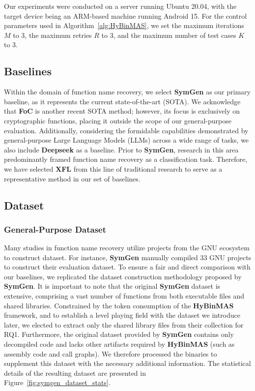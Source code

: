 \documentclass[acmsmall,screen,review,anonymous]{acmart} %
\begin{document}
Our experiments were conducted on a server running Ubuntu 20.04, with the target device being an ARM-based machine running Android 15. For the control parameters used in Algorithm~\ref{alg:HyBinMAS}, we set the maximum iterations $M$ to 3, the maximum retries $R$ to 3, and the maximum number of test cases $K$ to 3.

\subsection{Baselines}

Within the domain of function name recovery, we select \textbf{SymGen} as our primary baseline, as it represents the current state-of-the-art (SOTA). We acknowledge that \textbf{FoC} is another recent SOTA method; however, its focus is exclusively on cryptographic functions, placing it outside the scope of our general-purpose evaluation. Additionally, considering the formidable capabilities demonstrated by general-purpose Large Language Models (LLMs) across a wide range of tasks, we also include \textbf{Deepseek} as a baseline. Prior to \textbf{SymGen}, research in this area predominantly framed function name recovery as a classification task. Therefore, we have selected \textbf{XFL} from this line of traditional research to serve as a representative method in our set of baselines.

\subsection{Dataset}

\subsubsection{General-Purpose Dataset}

Many studies in function name recovery utilize projects from the GNU ecosystem to construct dataset. For instance, \textbf{SymGen} manually compiled 33 GNU projects to construct their evaluation dataset. To ensure a fair and direct comparison with our baselines, we replicated the dataset construction methodology proposed by  \textbf{SymGen}. It is important to note that the original \textbf{SymGen} dataset is extensive, comprising a vast number of functions from both executable files and shared libraries. Constrained by the token consumption of the \textbf{HyBinMAS} framework, and to establish a level playing field with the dataset we introduce later, we elected to extract only the shared library files from their collection for RQ1. Furthermore, the original dataset provided by \textbf{SymGen} contains only decompiled code and lacks other artifacts required by \textbf{HyBinMAS} (such as assembly code and call graphs). We therefore processed the binaries to supplement this dataset with the necessary additional information. The statistical details of the resulting dataset are presented in Figure~\ref{fig:symgen_dataset_stats}.
\end{document}
